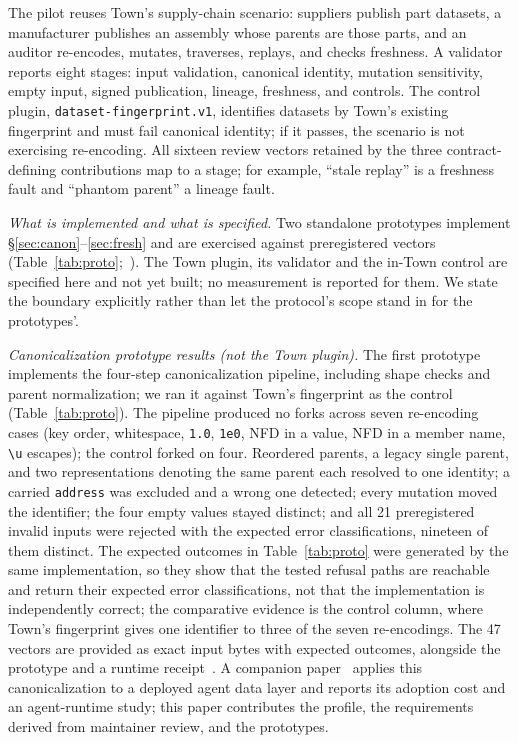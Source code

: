 \documentclass[conference]{IEEEtran}
\begin{document}
The pilot reuses Town's supply-chain scenario: suppliers publish part datasets, a manufacturer publishes an assembly whose parents are those parts, and an auditor re-encodes, mutates, traverses, replays, and checks freshness. A validator reports eight stages: input validation, canonical identity, mutation sensitivity, empty input, signed publication, lineage, freshness, and controls. The control plugin, \texttt{dataset-fingerprint.v1}, identifies datasets by Town's existing fingerprint and must fail canonical identity; if it passes, the scenario is not exercising re-encoding. All sixteen review vectors retained by the three contract-defining contributions map to a stage; for example, ``stale replay'' is a freshness fault and ``phantom parent'' a lineage fault.

\emph{What is implemented and what is specified.} Two standalone prototypes implement \S\ref{sec:canon}--\ref{sec:fresh} and are exercised against preregistered vectors (Table~\ref{tab:proto};~\cite{artifact}). The Town plugin, its validator and the in-Town control are specified here and not yet built; no measurement is reported for them. We state the boundary explicitly rather than let the protocol's scope stand in for the prototypes'.

\emph{Canonicalization prototype results (not the Town plugin).} The first prototype implements the four-step canonicalization pipeline, including shape checks and parent normalization; we ran it against Town's fingerprint as the control (Table~\ref{tab:proto}). The pipeline produced no forks across seven re-encoding cases (key order, whitespace, \texttt{1.0}, \texttt{1e0}, NFD in a value, NFD in a member name, \verb|\u| escapes); the control forked on four. Reordered parents, a legacy single parent, and two representations denoting the same parent each resolved to one identity; a carried \texttt{address} was excluded and a wrong one detected; every mutation moved the identifier; the four empty values stayed distinct; and all 21 preregistered invalid inputs were rejected with the expected error classifications, nineteen of them distinct. The expected outcomes in Table~\ref{tab:proto} were generated by the same implementation, so they show that the tested refusal paths are reachable and return their expected error classifications, not that the implementation is independently correct; the comparative evidence is the control column, where Town's fingerprint gives one identifier to three of the seven re-encodings. The 47 vectors are provided as exact input bytes with expected outcomes, alongside the prototype and a runtime receipt~\cite{artifact}. A companion paper~\cite{companion} applies this canonicalization to a deployed agent data layer and reports its adoption cost and an agent-runtime study; this paper contributes the profile, the requirements derived from maintainer review, and the prototypes.
\end{document}
